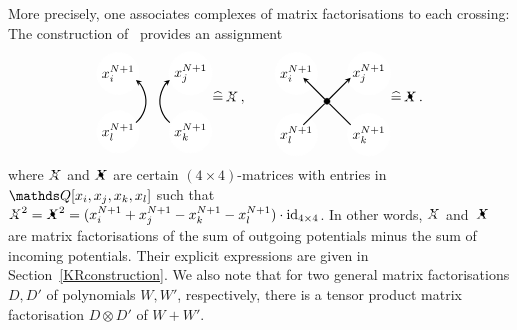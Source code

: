 \documentclass{compositio}
\theoremstyle{definition}
\numberwithin{equation}{section}
\begin{document}
More precisely, one associates complexes of matrix factorisations to each crossing: The construction of~\cite{kr0401268} provides an assignment
\begin{equation}
\label{DeltaX}
\begin{tikzpicture}[scale=0.7,baseline, inner sep=1mm, >=stealth]
\node (1) at (-2.5,1.0) [circle,inner sep=1.5pt, draw=white,fill= white] {$x^{N+1}_{i}$};
\node (2) at (0.1,1.0) [circle,inner sep=1.5pt, draw=white,fill= white] {$x^{N+1}_{j}$};
\node (3) at (0.1,-1.1) [circle,inner sep=1.5pt, draw=white,fill= white] {$x^{N+1}_{k}$};
\node (3) at (-2.5,-1.1) [circle,inner sep=1.5pt, draw=white,fill= white] {$x^{N+1}_{l}$};
\draw[ ->, thick, shift={(-2.5,0)} ]  (-50:1) arc (-50:50:1); 
\draw[ ->, thick ] (230:1) arc (230:130:1); 
\end{tikzpicture}
\widehat = \,
\Xcirc \, ,
\qquad 
\begin{tikzpicture}[scale=0.7,baseline, inner sep=1mm, >=stealth]
\node (1) at (-1.1,1.0) [circle,inner sep=1.5pt, draw=white,fill= white] {$x^{N+1}_{i}$};
\node (2) at (1.5,1.0) [circle,inner sep=1.5pt, draw=white,fill= white] {$x^{N+1}_{j}$};
\node (3) at (1.5,-1.2) [circle,inner sep=1.5pt, draw=white,fill= white] {$x^{N+1}_{k}$};
\node (3) at (-1.1,-1.2) [circle,inner sep=1.5pt, draw=white,fill= white] {$x^{N+1}_{l}$};
\node (0) at (0,0) [circle,inner sep=1.5pt, thin,draw=black,fill= black] {};
\node (bl) at (-1,-1) [circle] {};
\node (br) at (1,-1) [circle] {};
\node (tl) at (-1,1) [circle] {};
\node (tr) at (1,1) [circle] {};
\draw[-,  thick] (bl) -- (0); 
\draw[-,  thick] (br) -- (0); 
\draw[->,  thick] (0) -- (tl); 
\draw[->,  thick] (0) -- (tr); 
\end{tikzpicture}
\widehat = \,
\Xbul\,.
\end{equation}
where $\Xcirc$ and $\Xbul$ are certain $(4\times 4)$-matrices with entries in $\nQ[x_{i},x_{j},x_{k},x_{l}]$ such that $\Xcirc^2=\Xbul^2 = (x^{N+1}_{i}+x^{N+1}_{j}-x^{N+1}_{k}-x^{N+1}_{l})\cdot\operatorname{id}_{4\times 4}$. In other words, $\Xcirc$ and~$\Xbul$ are matrix factorisations of the sum of outgoing potentials minus the sum of incoming potentials. Their explicit expressions are given in Section~\ref{KRconstruction}. We also note that for two general matrix factorisations $D,D'$  of polynomials $W,W'$, respectively, there is a tensor product matrix factorisation $D\otimes D'$ of $W+W'$. 
\end{document}
